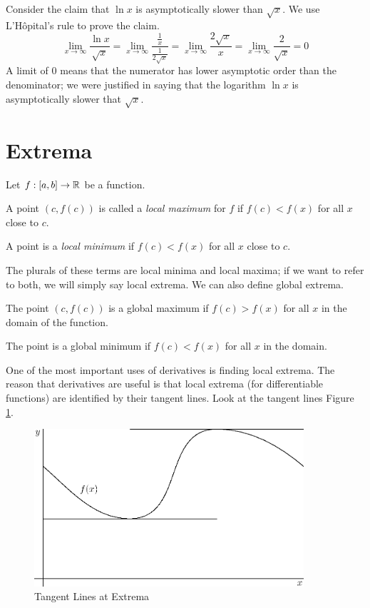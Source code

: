 \documentclass[fleqn]{report}
\begin{document}
\begin{example}
Consider  the claim that
$\ln x$ is asymptotically slower than $\sqrt{x}$. We use
L'H\^opital's rule to prove the claim.
\begin{equation*}
\lim_{x \rightarrow \infty} \frac{\ln x}{\sqrt{x}} = \lim_{x
\rightarrow \infty} \frac{\frac{1}{x}}{\frac{1}{2\sqrt{x}}} =
\lim_{x \rightarrow \infty} \frac{2 \sqrt{x}}{x} = \lim_{x
\rightarrow \infty} \frac{2}{\sqrt{x}} = 0
\end{equation*}
A limit of $0$ means that the numerator has lower
asymptotic order than the denominator; we were justified in
saying that the logarithm $\ln x$ is asymptotically slower
that $\sqrt{x}$. 
\end{example}

\section{Extrema}
\label{extrema}

Let $f: [a,b] \rightarrow \mathbb{R}$ be a function. 
\begin{smallitemize}
\item A point $(c,f(c))$ is called a \emph{local maximum} for
$f$ if $f(c) < f(x)$ for all $x$ close to $c$. 
\item A point is a \emph{local minimum} if $f(c) < f(x)$ for
all $x$ close to $c$. 
\end{smallitemize} 
The plurals of these terms are local minima and local maxima;
if we want to refer to both, we will simply say local extrema.
We can also define global extrema. 
\begin{smallitemize}
\item The point $(c,f(c))$ is a
global maximum if $f(c) > f(x)$ for all $x$ in the domain of
the function. 
\item The point is a global minimum if $f(c) < f(x)$
for all $x$ in the domain. 
\end{smallitemize}
One of the most important uses of derivatives is finding local
extrema. The reason that derivatives are useful is that local
extrema (for differentiable functions) are identified by their
tangent lines. Look at the tangent lines Figure
\ref{figure-tangent-lines-at-extrema}. 

\begin{figure}[ht]
\centering
\includegraphics[width=10cm]{figure54.eps}
\caption{Tangent Lines at Extrema}
\label{figure-tangent-lines-at-extrema}
\end{figure}
\end{document}
